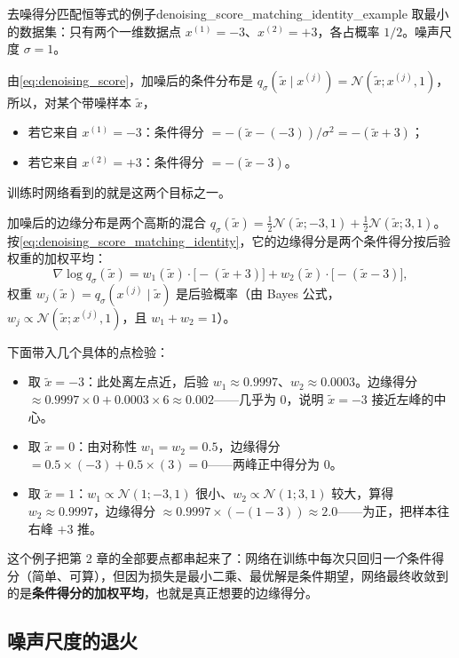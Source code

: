 \begin{example}{去噪得分匹配恒等式的例子}{denoising_score_matching_identity_example}
取最小的数据集：只有两个一维数据点 $x^{(1)}=-3$、$x^{(2)}=+3$，各占概率 $1/2$。噪声尺度 $\sigma=1$。

由\eqref{eq:denoising_score}，加噪后的条件分布是 $q_\sigma(\tilde x\mid x^{(j)})=\mathcal N(\tilde x;x^{(j)},1)$，所以，对某个带噪样本 $\tilde x$，
\begin{itemize}
\item 若它来自 $x^{(1)}=-3$：条件得分 $=-(\tilde x-(-3))/\sigma^2=-(\tilde x+3)$；
\item 若它来自 $x^{(2)}=+3$：条件得分 $=-(\tilde x-3)$。
\end{itemize}
训练时网络看到的就是这两个目标之一。

加噪后的边缘分布是两个高斯的混合 $q_\sigma(\tilde x)=\tfrac12\mathcal N(\tilde x;-3,1)+\tfrac12\mathcal N(\tilde x;3,1)$。按\eqref{eq:denoising_score_matching_identity}，它的边缘得分是两个条件得分按后验权重的加权平均：
\begin{equation}
\nabla\log q_\sigma(\tilde x)=w_1(\tilde x)\cdot\big[-(\tilde x+3)\big]+w_2(\tilde x)\cdot\big[-(\tilde x-3)\big],
\end{equation}
权重 $w_j(\tilde x)=q_\sigma(x^{(j)}\mid\tilde x)$ 是后验概率（由 Bayes 公式，$w_j\propto\mathcal N(\tilde x;x^{(j)},1)$，且 $w_1+w_2=1$）。

下面带入几个具体的点检验：
\begin{itemize}
\item 取 $\tilde x=-3$：此处离左点近，后验 $w_1\approx0.9997$、$w_2\approx0.0003$。边缘得分 $\approx0.9997\times0+0.0003\times6\approx0.002$——几乎为 $0$，说明 $\tilde x=-3$ 接近左峰的中心。
\item 取 $\tilde x=0$：由对称性 $w_1=w_2=0.5$，边缘得分 $=0.5\times(-3)+0.5\times(3)=0$——两峰正中得分为 $0$。
\item 取 $\tilde x=1$：$w_1\propto\mathcal N(1;-3,1)$ 很小、$w_2\propto\mathcal N(1;3,1)$ 较大，算得 $w_2\approx0.9997$，边缘得分 $\approx0.9997\times(-(1-3))\approx2.0$——为正，把样本往右峰 $+3$ 推。
\end{itemize}
这个例子把第 2 章的全部要点都串起来了：网络在训练中每次只回归\emph{一个}条件得分（简单、可算），但因为损失是最小二乘、最优解是条件期望，网络最终收敛到的是\textbf{条件得分的加权平均}，也就是真正想要的边缘得分。
\end{example}

\subsection{噪声尺度的退火}

